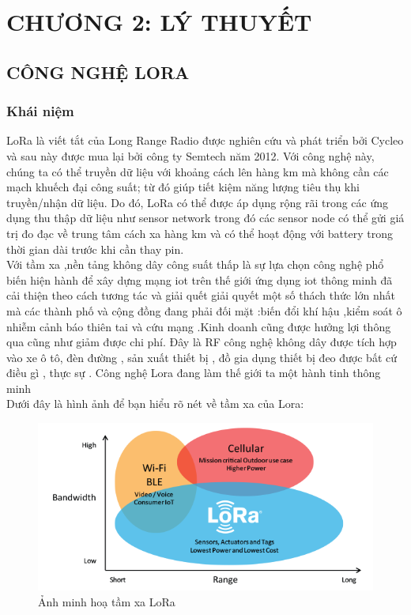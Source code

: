 \section*{CHƯƠNG 2: LÝ THUYẾT}
\setcounter{section}{2}
\setcounter{figure}{0}
\setcounter{subsection}{0}
\subsection{CÔNG NGHỆ LORA}
\subsubsection{Khái niệm}
LoRa là viết tắt của Long Range Radio được nghiên cứu và phát triển bởi Cycleo và sau này được mua lại bởi công ty Semtech năm 2012. Với công nghệ này, chúng ta có thể truyền dữ liệu với khoảng cách lên hàng km mà không cần các mạch khuếch đại công suất; từ đó giúp tiết kiệm năng lượng tiêu thụ khi truyền/nhận dữ liệu. Do đó, LoRa có thể được áp dụng rộng rãi trong các ứng dụng thu thập dữ liệu như sensor network trong đó các sensor node có thể gửi giá trị đo đạc về trung tâm cách xa hàng km và có thể hoạt động với battery trong thời gian dài trước khi cần thay pin.\\
\indent Với tầm xa ,nền tảng không dây công suất thấp là sự lựa chọn công nghệ phổ biến hiện hành để xây dựng mạng iot trên thế giới ứng dụng iot thông minh đã cải thiện theo cách tương tác và giải quết giải quyết một số thách thức lớn nhất mà các thành phố và cộng đồng đang phải đối mặt :biến đổi khí hậu ,kiểm soát ô nhiễm cảnh báo thiên tai và cứu mạng .Kinh doanh cũng được hưởng lợi thông qua cũng như giảm được chi phí. Đây là RF công nghệ không dây được tích hợp vào xe ô tô, đèn đường , sản xuất thiết bị , đồ gia dụng thiết bị đeo được bất cứ điều gì , thực sự . Công nghệ Lora đang làm thế giới ta một hành tinh thông minh\\
\indent Dưới đây là hình ảnh để bạn hiểu rõ nét về tầm xa của Lora:
\begin{figure}[H]
	\centering
	\includegraphics[scale=.5]{Chapter 2/image chapter 2/tamxaLoRa.png}
	\caption[Ảnh minh hoạ tầm xa LoRa]{Ảnh minh hoạ tầm xa LoRa}
	\label{hinh21}
\end{figure}
